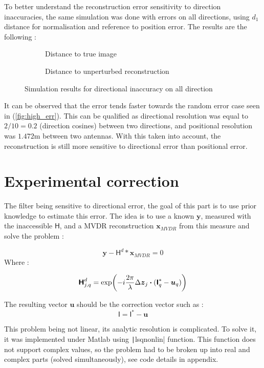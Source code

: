 \documentclass[titlepage]{article}
\renewcommand{\H}{\boldsymbol{\mathsf{H}}}
\newcommand{\I}{\boldsymbol{\mathsf{I}}}
\newcommand{\x}{\boldsymbol{x}}
\newcommand{\y}{\boldsymbol{y}}
\newcommand{\z}{\boldsymbol{z}}
\renewcommand{\u}{\boldsymbol{u}}
\begin{document}
	To better understand the reconstruction error sensitivity to direction inaccuracies, the same simulation was done with errors on all directions, using $d_1$ distance for normalisation and reference to position error. The results are the following :
	
	\begin{figure}[H]
		\centering
		\begin{subfigure}{.5\textwidth}
			\centering
			
			\caption{Distance to true image}
		\end{subfigure}%
		\begin{subfigure}{.5\textwidth}
			\centering
			
			\caption{Distance to unperturbed reconstruction}
		\end{subfigure}
		\caption{Simulation results for directional inaccuracy on all direction}
	\end{figure}

	It can be observed that the error tends faster towards the random error case seen in (\ref{fig:high_err}). This can be qualified as directional resolution was equal to $2/10=0.2$ (direction cosines) between two directions, and positional resolution was $1.472$m between two  antennas. With this taken into account, the reconstruction is still more sensitive to directional error than positional error. 
	
	\newpage
	\part{Experimental correction}
	
	The filter being sensitive to directional error, the goal of this part is to use prior knowledge to estimate this error. The idea is to use a known $\y$, measured with the inaccessible $\H$, and a MVDR reconstruction $\x_{MVDR}$ \cite{TER} from this measure and solve the problem :

	
	$$
		\y - \H^d*\x_{MVDR} = 0
	$$
	Where :
	
	$$
		\H_{j,q}^d = \exp(-i\frac{2\pi}{\lambda}\Delta\z_j\dotproduct(\I_q^* - \u_q))
	$$
	
	The resulting vector $\u$ should be the correction vector such as :
	$$
		\I = \I^*-\u
	$$
	
	This problem being not linear, its analytic resolution is complicated. To solve it, it was implemented under Matlab using \texttt|lsqnonlin| function. This function does not support complex values, so the problem had to be broken up into real and complex parts (solved simultaneously), see code details in appendix.\\
	
\end{document}
